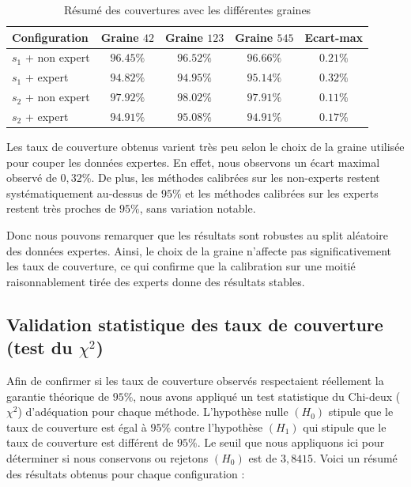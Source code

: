 \documentclass[a4paper,12pt]{article}
\begin{document}
\begin{table}[h]
    \centering
    \begin{tabular}{|l|c|c|c|c|}
        \hline
        \textbf{Configuration} & \textbf{Graine $42$} & \textbf{Graine $123$} & \textbf{Graine $545$} & \textbf{Ecart-max} \\
        \hline
        $s_1$ + non expert & $96.45\%$ & $96.52\%$ & $96.66\%$ & $0.21\%$ \\
        $s_1$ + expert & $94.82\%$ & $94.95\%$ & $95.14\%$ & $0.32\%$ \\
        $s_2$ + non expert & $97.92\%$ & $98.02\%$ & $97.91\%$ & $0.11\%$ \\
        $s_2$ + expert & $94.91\%$ & $95.08\%$ & $94.91\%$ & $0.17\%$ \\
        \hline
    \end{tabular}
    \caption{Résumé des couvertures avec les différentes graines}
    \label{tab:couvertures_graines}
\end{table}

Les taux de couverture obtenus varient très peu selon le choix de la graine utilisée pour couper les données expertes. En effet, nous observons un écart maximal observé de $0,32\%$. De plus, les méthodes calibrées sur les non-experts restent systématiquement au-dessus de $95\%$ et les méthodes calibrées sur les experts restent très proches de $95\%$, sans variation notable.

\vspace{0.2cm}

Donc nous pouvons remarquer que les résultats sont robustes au split aléatoire des données expertes. Ainsi, le choix de la graine n’affecte pas significativement les taux de couverture, ce qui confirme que la calibration sur une moitié raisonnablement tirée des experts donne des résultats stables.

\subsection{Validation statistique des taux de couverture (test du $\chi^2$)}

Afin de confirmer si les taux de couverture observés respectaient réellement la garantie théorique de $95\%$, nous avons appliqué un test statistique du Chi-deux ($\chi^2$) d’adéquation pour chaque méthode. L’hypothèse nulle $(H_0)$ stipule que le taux de couverture est égal à $95\%$ contre l'hypothèse $(H_1)$ qui stipule que le taux de couverture est différent de $95\%$. Le seuil que nous appliquons ici pour déterminer si nous conservons ou rejetons $(H_0)$ est de $3,8415$. Voici un résumé des résultats obtenus pour chaque configuration :
\end{document}
